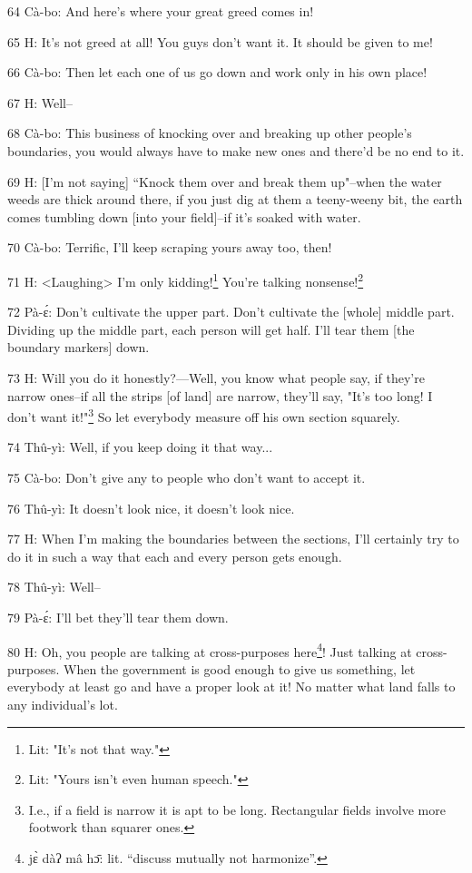 64 Cà-bo: And here's where your great greed comes in!

65 H: It's not greed at all! You guys don't want it. It should be given to me!

66 Cà-bo: Then let each one of us go down and work only in his own place!

67 H: Well--

68 Cà-bo: This business of knocking over and breaking up other people's boundaries,
you would always have to make new ones and there'd be no end to it.

69 H: [I'm not saying] ``Knock them over and break them up"--when the
water weeds are thick around there, if you just dig at them a teeny-weeny bit,
the earth comes tumbling down [into your field]--if it's soaked with water.

70 Cà-bo: Terrific, I'll keep scraping yours away too, then!

71 H: <Laughing> I'm only kidding!\footnote{Lit: "It's not that way."} You're talking nonsense!\footnote{Lit: "Yours isn't even human speech."}

72 Pà-ɛ́: Don't cultivate the upper part. Don't cultivate the [whole] middle
part. Dividing up the middle part, each person will get half. I'll tear them [the
boundary markers] down.

73 H: Will you do it honestly?---Well, you know what people say, if they're narrow
ones--if all the strips [of land] are narrow, they'll say, "It's too long!
I don't want it!"\footnote{I.e., if a field is narrow it is apt to be long. Rectangular fields involve more footwork than squarer ones.} So let everybody measure off his own section squarely.

74 Thû-yì: Well, if you keep doing it that way...

75 Cà-bo: Don't give any to people who don't want to accept it.

76 Thû-yì: It doesn't look nice, it doesn't look nice.

77 H: When I'm making the boundaries between the sections, I'll certainly try to
do it in such a way that each and every person gets enough.

78 Thû-yì: Well--

79 Pà-ɛ́: I'll bet they'll tear them down.

80 H: Oh, you people are talking at cross-purposes here\footnote{jɛ̀ dàʔ mâ hɔ̄: lit. ``discuss mutually not harmonize''.}! Just talking at cross-purposes.
When the government is good enough to give us something, let everybody at least
go and have a proper look at it! No matter what land falls to any individual's
lot.

